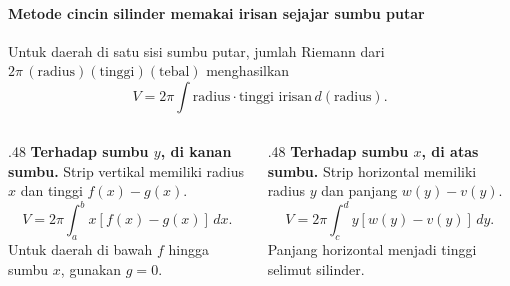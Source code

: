 \documentclass{../../kalkulus-ppt}
\begin{document}
\begin{frame}{\insertsection}
    \framesubtitle{Metode cincin silinder memakai irisan sejajar sumbu putar}
    \begin{teorema}
        Untuk daerah di satu sisi sumbu putar, jumlah Riemann dari
        $2\pi\,(\text{radius})(\text{tinggi})(\text{tebal})$ menghasilkan
        \[
            V=2\pi\int \text{radius}\cdot\text{tinggi irisan}\,d(\text{radius}).
        \]
    \end{teorema}
    \begin{columns}[t,onlytextwidth]
        \begin{column}{.48\textwidth}
            \textbf{Terhadap sumbu $y$, di kanan sumbu.}
            Strip vertikal memiliki radius $x$ dan tinggi $f(x)-g(x)$.
            \[
                V=2\pi\int_a^b x[f(x)-g(x)]\,dx.
            \]
            Untuk daerah di bawah $f$ hingga sumbu $x$, gunakan $g=0$.
        \end{column}
        \begin{column}{.48\textwidth}
            \textbf{Terhadap sumbu $x$, di atas sumbu.}
            Strip horizontal memiliki radius $y$ dan panjang $w(y)-v(y)$.
            \[
                V=2\pi\int_c^d y[w(y)-v(y)]\,dy.
            \]
            Panjang horizontal menjadi tinggi selimut silinder.
        \end{column}
    \end{columns}
\end{frame}
\end{document}
